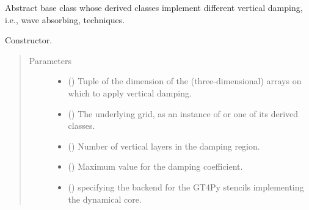\documentclass[letterpaper,10pt,english]{sphinxmanual}
\begin{document}
\begin{fulllineitems}
\label{\detokenize{api:dycore.vertical_damping.VerticalDamping}}
Abstract base class whose derived classes implement different vertical damping, i.e., wave absorbing, techniques.

\begin{fulllineitems}
\label{\detokenize{api:dycore.vertical_damping.VerticalDamping.__init__}}
Constructor.
\begin{quote}\begin{description}
\item[{Parameters}] \leavevmode\begin{itemize}
\item {} 
 () \textendash{} Tuple of the dimension of the (three-dimensional) arrays on which to apply vertical damping.

\item {} 
 () \textendash{} The underlying grid, as an instance of {\hyperref[\detokenize{api:grids.grid_xyz.GridXYZ}]{}} or one of its derived classes.

\item {} 
 () \textendash{} Number of vertical layers in the damping region.

\item {} 
 () \textendash{} Maximum value for the damping coefficient.

\item {} 
 () \textendash{}  specifying the backend for the GT4Py stencils implementing the dynamical core.

\end{itemize}

\end{description}\end{quote}


\end{fulllineitems}
\end{fulllineitems}
\end{document}
